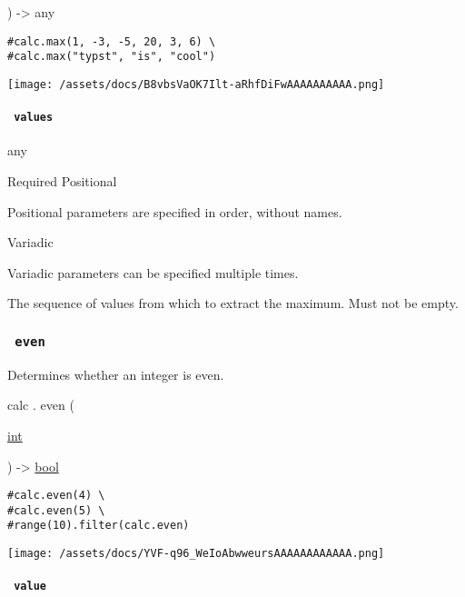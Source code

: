 ) -\textgreater{} { any }

\begin{verbatim}
#calc.max(1, -3, -5, 20, 3, 6) \
#calc.max("typst", "is", "cool")
\end{verbatim}

\texttt{[image: /assets/docs/B8vbsVaOK7Ilt-aRhfDiFwAAAAAAAAAA.png]}

\paragraph{\texorpdfstring{\texttt{\ values\ }}{ values }}\label{functions-max-values}

{ any }

{Required} {{ Positional }}

\label{functions-max-values-positional-tooltip}
Positional parameters are specified in order, without names.

{{ Variadic }}

\label{functions-max-values-variadic-tooltip}
Variadic parameters can be specified multiple times.

The sequence of values from which to extract the maximum. Must not be
empty.

\subsubsection{\texorpdfstring{\texttt{\ even\ }}{ even }}\label{functions-even}

Determines whether an integer is even.

calc { . } { even } (

{ \href{/docs/reference/foundations/int/}{int} }

) -\textgreater{} \href{/docs/reference/foundations/bool/}{bool}

\begin{verbatim}
#calc.even(4) \
#calc.even(5) \
#range(10).filter(calc.even)
\end{verbatim}

\texttt{[image: /assets/docs/YVF-q96\_WeIoAbwweursAAAAAAAAAAAA.png]}

\paragraph{\texorpdfstring{\texttt{\ value\ }}{ value }}\label{functions-even-value}

